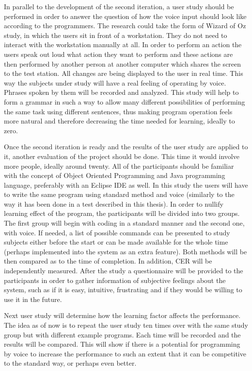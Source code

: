 In parallel to the development of the second iteration, a user study should be performed in order to answer the question of how the voice input should look like according to the programmers. The research could take the form of Wizard of Oz study, in which the users sit in front of a workstation. They do not need to interact with the workstation manually at all. In order to perform an action the users speak out loud what action they want to perform and these actions are then performed by another person at another computer which shares the screen to the test station. All changes are being displayed to the user in real time. This way the subjects under study will have a real feeling of operating by voice. Phrases spoken by them will be recorded and analyzed. This study will help to form a grammar in such a way to allow many different possibilities of performing the same task using different sentences, thus making program operation feels more natural and therefore decreasing the time needed for learning, ideally to zero. 

Once the second iteration is ready and the results of the user study are applied to it, another evaluation of the project should be done. This time it would involve more people, ideally around twenty. All of the participants should be familiar with the concept of Object Oriented Programming and Java programming language, preferably with an Eclipse IDE as well. In this study the users will have to write the same program using standard method and voice (similarly to the way it has been done in a test described in this thesis). In order to nullify learning effect of the program, the participants will be divided into two groups. The first group will begin with coding in a standard manner and the second one, with voice. If needed, a list of possible commands can be presented to study subjects either before the start or can be made available for the whole time (perhaps implemented into the system as an extra feature). Both methods will be then compared as to the time of completion. In addition, CER will be independently measured. After the study a questionnaire will be provided to the participants in order to gather information of subjective feelings about the system, such as if it is easy, intuitive, frustrating and if they would be willing to use it in the future.  

Next user study will determine how the learning factor affects the performance. The idea as of now is to repeat the user study ten times over with the same study group but with different example programs. Each time will be recorded and the results will be compared. This will show if there is a potential for programming by voice to increase the performance to such an extent that it can be competitive to the standard way, or perhaps even better.

